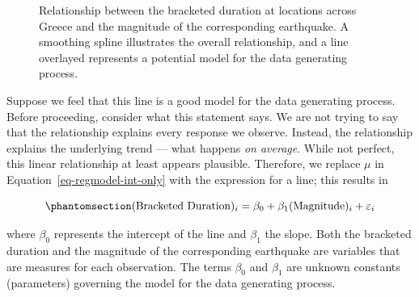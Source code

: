 \documentclass[
  letterpaper,
  DIV=11,
  numbers=noendperiod]{scrreprt}
\theoremstyle{plain}
\theoremstyle{definition}
\theoremstyle{definition}
\theoremstyle{remark}
\begin{document}
\begin{figure}


\caption{\label{fig-regmodel-slr-plot}Relationship between the bracketed
duration at locations across Greece and the magnitude of the
corresponding earthquake. A smoothing spline illustrates the overall
relationship, and a line overlayed represents a potential model for the
data generating process.}

\end{figure}%

Suppose we feel that this line is a good model for the data generating
process. Before proceeding, consider what this statement says. We are
not trying to say that the relationship explains every response we
observe. Instead, the relationship explains the underlying trend ---
what happens \emph{on average}. While not perfect, this linear
relationship at least appears plausible. Therefore, we replace \(\mu\)
in Equation~\ref{eq-regmodel-int-only} with the expression for a line;
this results in

\begin{equation}\phantomsection\label{eq-regmodel-slr}{(\text{Bracketed Duration})_i = \beta_0 + \beta_1 (\text{Magnitude})_i + \varepsilon_i}\end{equation}

where \(\beta_0\) represents the intercept of the line and \(\beta_1\)
the slope. Both the bracketed duration and the magnitude of the
corresponding earthquake are variables that are measures for each
observation. The terms \(\beta_0\) and \(\beta_1\) are unknown constants
(parameters) governing the model for the data generating process.
\end{document}
